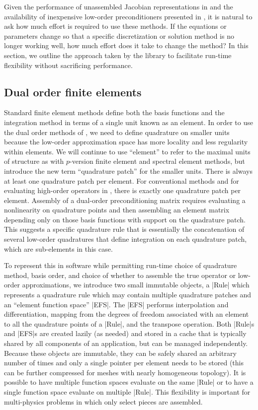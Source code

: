 Given the performance of unassembled Jacobian representations in  and the availability of inexpensive low-order preconditioners presented in , it is natural to ask how much effort is required to use these methods.
If the equations or parameters change so that a specific discretization or solution method is no longer working well, how much effort does it take to change the method?
In this section, we outline the approach taken by the {\Dohp} library to facilitate run-time flexibility without sacrificing performance.

\subsection{Dual order finite elements}
Standard finite element methods define both the basis functions and the integration method in terms of a single unit known as an element.
In order to use the dual order methods of , we need to define quadrature on smaller units because the low-order approximation space has more locality and less regularity within elements.
We will continue to use ``element'' to refer to the maximal units of structure as with $p$-version finite element and spectral element methods, but introduce the new term ``quadrature patch'' for the smaller units.
There is always at least one quadrature patch per element.
For conventional methods and for evaluating high-order operators in \Dohp, there is exactly one quadrature patch per element.
Assembly of a dual-order preconditioning matrix requires evaluating a nonlinearity on quadrature points and then assembling an element matrix depending only on those basis functions with support on the quadrature patch.
This suggests a specific quadrature rule that is essentially the concatenation of several low-order quadratures that define integration on each quadrature patch, which are sub-elements in this case.

To represent this in software while permitting run-time choice of quadrature method, basis order, and choice of whether to assemble the true operator or low-order approximations, we introduce two small immutable objects, a \cverb|Rule| which represents a quadrature rule which may contain multiple quadrature patches and an ``element function space'' \cverb|EFS|.
The \cverb|EFS| performs interpolation and differentiation, mapping from the degrees of freedom associated with an element to all the quadrature points of a \cverb|Rule|, and the transpose operation.
Both \cverb|Rule|s and \cverb|EFS|s are created lazily (as needed) and stored in a cache that is typically shared by all components of an application, but can be managed independently.
Because these objects are immutable, they can be safely shared an arbitrary number of times and only a single pointer per element needs to be stored (this can be further compressed for meshes with nearly homogeneous topology).
It is possible to have multiple function spaces evaluate on the same \cverb|Rule| or to have a single function space evaluate on multiple \cverb|Rule|.
This flexibility is important for multi-physics problems in which only select pieces are assembled.


